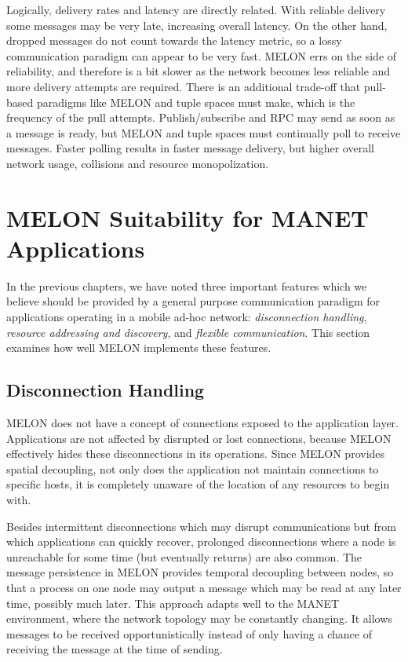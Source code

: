 Logically, delivery rates and latency are directly related. With reliable delivery some messages may be very late, increasing overall latency. On the other hand, dropped messages do not count towards the latency metric, so a lossy communication paradigm can appear to be very fast. MELON errs on the side of reliability, and therefore is a bit slower as the network becomes less reliable and more delivery attempts are required. There is an additional trade-off that pull-based paradigms like MELON and tuple spaces must make, which is the frequency of the pull attempts. Publish/subscribe and RPC may send as soon as a message is ready, but MELON and tuple spaces must continually poll to receive messages. Faster polling results in faster message delivery, but higher overall network usage, collisions and resource monopolization.

\section{MELON Suitability for MANET Applications}

In the previous chapters, we have noted three important features which we believe should be provided by a general purpose communication paradigm for applications operating in a mobile ad-hoc network: \textit{disconnection handling}, \textit{resource addressing and discovery}, and \textit{flexible communication}. This section examines how well MELON implements these features.

\subsection{Disconnection Handling}

MELON does not have a concept of connections exposed to the application layer. Applications are not affected by disrupted or lost connections, because MELON effectively hides these disconnections in its operations. Since MELON provides spatial decoupling, not only does the application not maintain connections to specific hosts, it is completely unaware of the location of any resources to begin with.

Besides intermittent disconnections which may disrupt communications but from which applications can quickly recover, prolonged disconnections where a node is unreachable for some time (but eventually returns) are also common. The message persistence in MELON provides temporal decoupling between nodes, so that a process on one node may output a message which may be read at any later time, possibly much later. This approach adapts well to the MANET environment, where the network topology may be constantly changing. It allows messages to be received opportunistically instead of only having a chance of receiving the message at the time of sending.

